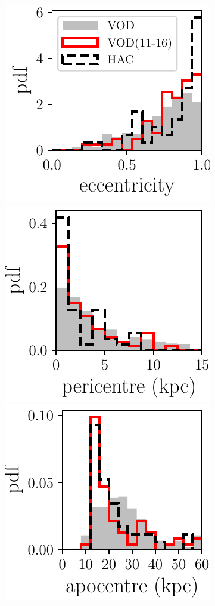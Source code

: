 \documentclass[a4paper,useAMS,usenatbib]{mnras}
\begin{document}
\begin{figure}
              \includegraphics[scale=0.473]{eccentricities.pdf} 
    \includegraphics[scale=0.473]{pericentres.pdf} 
                          \includegraphics[scale=0.473]{apocentres.pdf} 

\end{figure}
\end{document}
